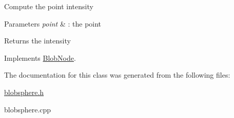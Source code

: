Compute the point intensity


\begin{DoxyParams}{Parameters}
{\em point} & : the point \\
\hline
\end{DoxyParams}
\begin{DoxyReturn}{Returns}
the intensity 
\end{DoxyReturn}


Implements \hyperlink{class_blob_node_a4987f9060e9141647c514efd9859d0ba}{BlobNode}.



The documentation for this class was generated from the following files:\begin{DoxyCompactItemize}
\item 
\hyperlink{blobsphere_8h}{blobsphere.h}\item 
blobsphere.cpp\end{DoxyCompactItemize}

